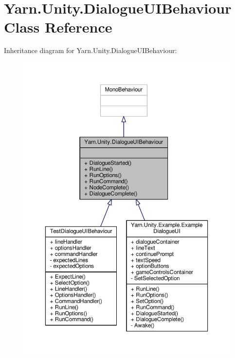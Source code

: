\hypertarget{a00038}{\section{Yarn.\-Unity.\-Dialogue\-U\-I\-Behaviour Class Reference}
\label{a00038}
}


Inheritance diagram for Yarn.\-Unity.\-Dialogue\-U\-I\-Behaviour\-:
\nopagebreak
\begin{figure}[H]
\begin{center}
\leavevmode
\includegraphics[width=350pt]{dd/d1d/a00336}
\end{center}
\end{figure}


